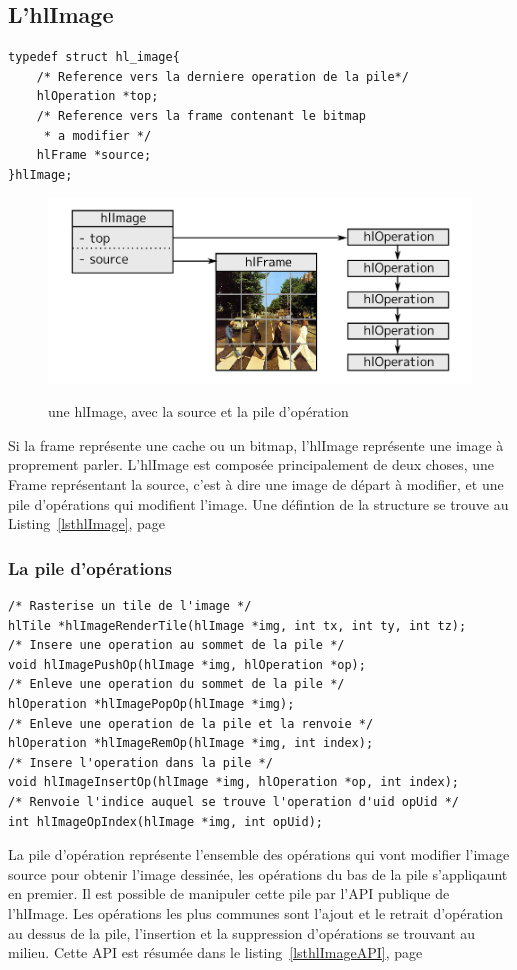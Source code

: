 		\subsection{L'hlImage}
		\begin{lstlisting}[float,caption={Définition des hlImages },frame=tb,label=lsthlImage]
typedef struct hl_image{
	/* Reference vers la derniere operation de la pile*/
	hlOperation *top;
	/* Reference vers la frame contenant le bitmap 
	 * a modifier */
	hlFrame *source;
}hlImage;
		\end{lstlisting}
		\begin{figure}[h]
			\centering
			\includegraphics[width=\textwidth]{images/hlImage1} 
			\label{fig:hlImage1}
			\caption{une hlImage, avec la source et la pile d'opération}
		\end{figure}
		Si la frame représente une cache ou un bitmap, l'hlImage représente une image à proprement parler. L'hlImage est composée principalement
		de deux choses, une Frame représentant la source, c'est à dire une image de départ à modifier, et une pile d'opérations
		qui modifient l'image.	
		Une défintion de la structure se trouve au Listing~\ref{lsthlImage}, page~\pageref{lsthlImage} 

		\subsubsection{La pile d'opérations}
		\begin{lstlisting}[float,caption={API des hlImages },frame=tb,label=lsthlImageAPI]
/* Rasterise un tile de l'image */
hlTile *hlImageRenderTile(hlImage *img, int tx, int ty, int tz);
/* Insere une operation au sommet de la pile */
void hlImagePushOp(hlImage *img, hlOperation *op);
/* Enleve une operation du sommet de la pile */
hlOperation *hlImagePopOp(hlImage *img);
/* Enleve une operation de la pile et la renvoie */
hlOperation *hlImageRemOp(hlImage *img, int index);
/* Insere l'operation dans la pile */
void hlImageInsertOp(hlImage *img, hlOperation *op, int index);
/* Renvoie l'indice auquel se trouve l'operation d'uid opUid */
int hlImageOpIndex(hlImage *img, int opUid);
		\end{lstlisting}
			La pile d'opération représente l'ensemble des opérations qui vont modifier l'image source pour obtenir l'image dessinée, les opérations
			du bas de la pile s'appliqaunt en premier. Il est
			possible de manipuler cette pile par l'API publique de l'hlImage. Les opérations les plus communes sont l'ajout et le retrait d'opération
			au dessus de la pile, l'insertion et la suppression d'opérations se trouvant au  milieu. Cette API est résumée dans le 
			listing~\ref{lsthlImageAPI}, page~\pageref{lsthlImageAPI}


